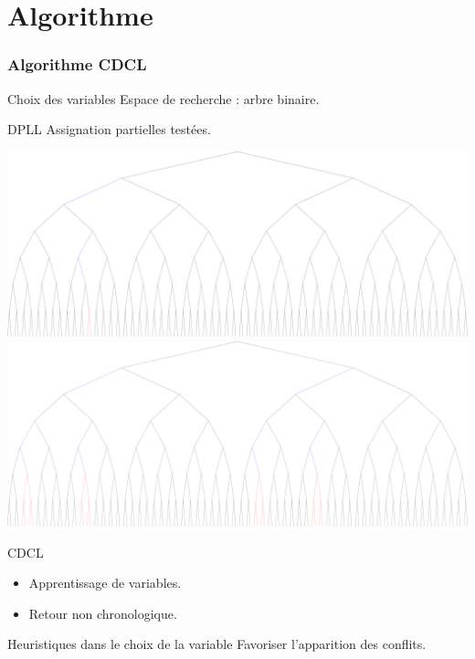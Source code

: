 \documentclass{beamer}
\begin{document}
\section{Algorithme}
\begin{frame}
    \frametitle{Algorithme CDCL}
    \begin{block}{Choix des variables}
        Espace de recherche : arbre binaire.
    \end{block}
    \begin{block}{DPLL}
        Assignation partielles testées.
    \end{block}
    \begin{center}
        \includegraphics[width=0.8\linewidth]{../reso/error.pdf} \\
        \vspace{1em}
        \includegraphics[width=0.8\linewidth]{../reso/eliminated.pdf}
    \end{center}
    \begin{block}{CDCL}
        \begin{itemize}
            \item Apprentissage de variables.
            \item Retour non chronologique.
        \end{itemize}
    \end{block}

    \begin{block}{Heuristiques dans le choix de la variable}
        Favoriser l'apparition des conflits.
    \end{block}


\end{frame}
\end{document}

